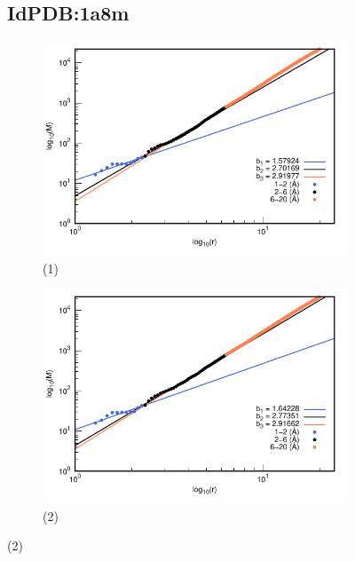 \begin{figure}[H]
	\subsection*{IdPDB:1a8m}
	
	\hspace{-0.3cm} 
	\begin{subfigure}{0.49\textwidth}
		\centering
		\includegraphics[width=\linewidth,page=1]{graphs/PDBs/1a8m/1a8maddH.pdf}
		\caption{(1)}
	\end{subfigure}
	\hspace{0.2cm}
	\begin{subfigure}{0.49\textwidth}
		\centering
		\includegraphics[width=\linewidth,page=1]{graphs/PDBs/1a8m/1a8mEm.pdf}
		\caption{(2)}
	\end{subfigure}
	

\end{figure}
